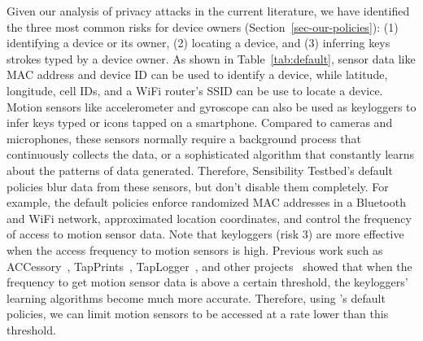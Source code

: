 Given our analysis of privacy attacks in the current literature, 
we have identified the three 
most common 
risks for device owners (Section~\ref{sec-our-policies}): (1) identifying a device or its owner, 
(2) locating a device, and (3) inferring keys strokes typed by a device owner. 
As shown in Table~\ref{tab:default}, 
sensor data like MAC address and device ID can be used to identify a device, while latitude, longitude, cell 
IDs, and a WiFi router's SSID can be use to locate a 
device. Motion sensors like accelerometer and gyroscope can also be used
as keyloggers to infer keys typed or icons tapped on a 
smartphone. Compared to cameras and microphones, these 
sensors normally require a background process that continuously 
collects the data, or a sophisticated algorithm that constantly learns 
about the patterns of data generated. 
Therefore, Sensibility Testbed's default policies 
blur data from these sensors, but don't disable them completely. 
For example, the default policies enforce randomized MAC addresses in a 
Bluetooth and WiFi network, approximated location coordinates, and 
control the frequency of access to motion sensor data. Note that keyloggers (risk 3)
are more effective when the access frequency to motion sensors is 
high. Previous work such as ACCessory~\cite{owusu2012accessory}, 
TapPrints~\cite{miluzzo2012tapprints}, TapLogger~\cite{xu2012taplogger}, 
and other projects~\cite{aviv2012practicality} showed that when the 
frequency to get motion sensor data is above a certain threshold, the keyloggers' 
learning algorithms become much more accurate. Therefore, 
using \sysname's default policies, we can limit 
motion sensors to be accessed at a rate lower than this threshold. 




